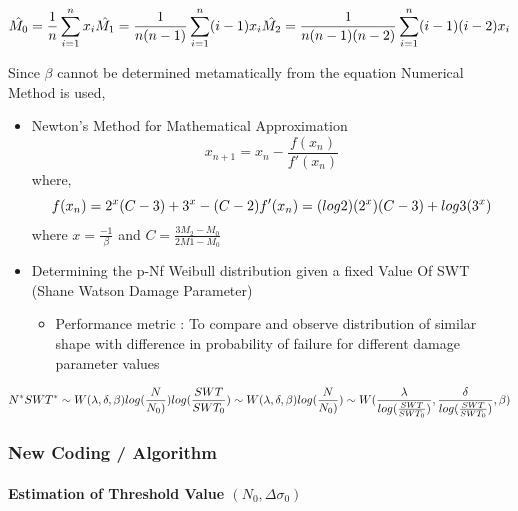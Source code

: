 \documentclass[11pt]{article}
\providecommand{\tightlist}{%
      \setlength{\itemsep}{0pt}\setlength{\parskip}{0pt}}
\begin{document}
\[
\hat{M_0} = \frac{1}{n}\sum_{i=1}^n x_i \\
\hat{M_1} = \frac{1}{n(n-1)}\sum_{i=1}^n (i - 1)x_i \\
\hat{M_2} = \frac{1}{n(n-1)(n-2)}\sum_{i=1}^n (i - 1)(i - 2)x_i \\
\]

Since \(\beta\) cannot be determined metamatically from the equation
Numerical Method is used,

\begin{itemize}
\item
  Newton's Method for Mathematical Approximation \[
  x_{n+1} = x_n - \frac{f(x_n)}{f'(x_n)}
  \] where, \[
  f(x_n) = 2^{x}(C-3) + 3^{x} - (C-2) \\
  f'(x_n) = (log2)(2^x)(C-3) + log3(3^x) \\
  \] where \(x = \frac{-1}{\beta}\) and
  \(C = \frac{3M_2 - M_0}{2M1 - M_0}\)
\item
  Determining the p-Nf Weibull distribution given a fixed Value Of SWT
  (Shane Watson Damage Parameter)

  \begin{itemize}
  \tightlist
  \item
    Performance metric : To compare and observe distribution of similar
    shape with difference in probability of failure for different damage
    parameter values
  \end{itemize}
\end{itemize}

\[
N^*SWT^* \sim W(\lambda,\delta,\beta) \\
log(\frac{N}{N_0)})log(\frac{SWT}{SWT_0}) \sim W(\lambda,\delta,\beta) \\
log(\frac{N}{N_0)})\sim W(\frac{\lambda}{log(\frac{SWT}{SWT_0}) },\frac{\delta}{log(\frac{SWT}{SWT_0}) },\beta) \\
\]

\hypertarget{new-coding-algorithm}{%
\subsubsection{New Coding / Algorithm}\label{new-coding-algorithm}}

\hypertarget{estimation-of-threshold-value-n_0deltasigma_0}{%
\paragraph{\texorpdfstring{Estimation of Threshold Value
\((N_0,\Delta\sigma_0)\)}{Estimation of Threshold Value (N\_0,\textbackslash{}Delta\textbackslash{}sigma\_0)}}\label{estimation-of-threshold-value-n_0deltasigma_0}}
\end{document}
